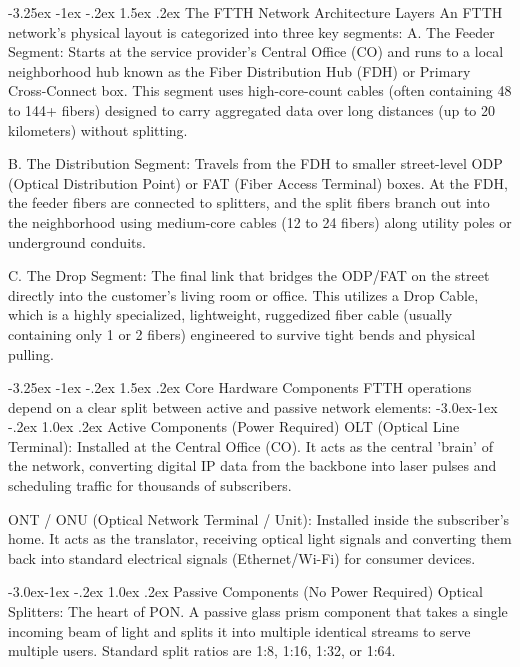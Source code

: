 \documentclass[11pt,a4paper]{report}
\makeatletter
\renewcommand{\section}{\@startsection{section}{1}{\z@}%
  {-3.25ex \@plus -1ex \@minus -.2ex}%
  {1.5ex \@plus.2ex}%
  {\normalfont\Large\bfseries\color{primaryColor}}}
\renewcommand{\subsection}{\@startsection{subsection}{2}{\z@}%
  {-3.0ex\@plus -1ex \@minus -.2ex}%
  {1.0ex \@plus .2ex}%
  {\normalfont\large\bfseries\color{secondaryColor}}}
\makeatother
\begin{document}
\section{The FTTH Network Architecture Layers}
An FTTH network's physical layout is categorized into three key segments:
A. The Feeder Segment: Starts at the service provider's Central Office (CO) and runs to a local neighborhood hub known as the Fiber Distribution Hub (FDH) or Primary Cross-Connect box. This segment uses high-core-count cables (often containing 48 to 144+ fibers) designed to carry aggregated data over long distances (up to 20 kilometers) without splitting.


B. The Distribution Segment: Travels from the FDH to smaller street-level ODP (Optical Distribution Point) or FAT (Fiber Access Terminal) boxes. At the FDH, the feeder fibers are connected to splitters, and the split fibers branch out into the neighborhood using medium-core cables (12 to 24 fibers) along utility poles or underground conduits.


C. The Drop Segment: The final link that bridges the ODP/FAT on the street directly into the customer's living room or office. This utilizes a Drop Cable, which is a highly specialized, lightweight, ruggedized fiber cable (usually containing only 1 or 2 fibers) engineered to survive tight bends and physical pulling.


\section{Core Hardware Components}
FTTH operations depend on a clear split between active and passive network elements:
\subsection{Active Components (Power Required)}
OLT (Optical Line Terminal): Installed at the Central Office (CO). It acts as the central 'brain' of the network, converting digital IP data from the backbone into laser pulses and scheduling traffic for thousands of subscribers.


ONT / ONU (Optical Network Terminal / Unit): Installed inside the subscriber's home. It acts as the translator, receiving optical light signals and converting them back into standard electrical signals (Ethernet/Wi-Fi) for consumer devices.


\subsection{Passive Components (No Power Required)}
Optical Splitters: The heart of PON. A passive glass prism component that takes a single incoming beam of light and splits it into multiple identical streams to serve multiple users. Standard split ratios are 1:8, 1:16, 1:32, or 1:64.
\end{document}
